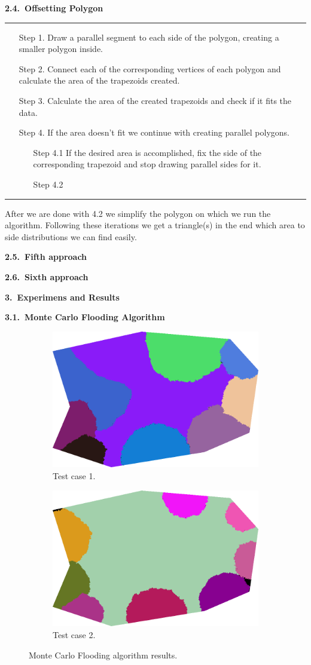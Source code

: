 \documentclass[11pt,leqno]{book}
\newcommand{\sect}[1]{\vskip7mm\par{\large \bf #1}}
\newcommand{\subsect}[1]{\vskip 3mm\par{\bf#1}}
\begin{document}
\subsect{2.4.~Offsetting Polygon}

\noindent\rule{\textwidth}{1pt}
\begin{itemize}
\item[Step 1.] Draw a parallel segment to each side of the polygon, creating a smaller polygon inside. 
\item[Step 2.] Connect each of the corresponding vertices of each polygon and calculate the area of the trapezoids created.
\item[Step 3.] Calculate the area of the created trapezoids and check if it fits the data.
\item[Step 4.] If the area doesn’t fit we continue with creating parallel polygons.
\begin{itemize}
  \item[Step 4.1] If the desired area is accomplished, fix the side of the corresponding trapezoid and stop drawing parallel sides for it.
  \item[Step 4.2] 
\end{itemize}
\end{itemize}
\noindent\rule{\textwidth}{1pt}

After we are done with 4.2 we simplify the polygon on which we run the algorithm. Following these iterations we get a triangle(s) in the end which area to side distributions we can find easily.

\subsect{2.5.~Fifth approach}

\subsect{2.6.~Sixth approach}

\sect{3.~Experimens and Results}

\subsect{3.1.~Monte Carlo Flooding Algorithm}

\begin{figure}
\centering
\begin{subfigure}{.5\textwidth}
  \centering
  \includegraphics[width=.5\linewidth]{pic08.png}
  \caption{Test case 1.}
  \label{fig:sub1}
\end{subfigure}%
\begin{subfigure}{.5\textwidth}
  \centering
  \includegraphics[width=.5\linewidth]{pic09.png}
  \caption{Test case 2.}
  \label{fig:sub2}
\end{subfigure}
\caption{Monte Carlo Flooding algorithm results.}
\label{fig:five}
\end{figure}
\end{document}
